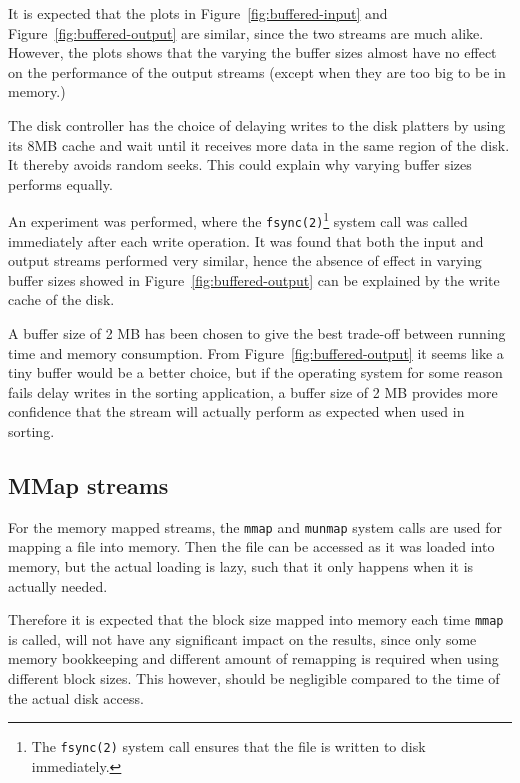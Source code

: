 \documentclass[a4paper,12pt]{article}
\begin{document}
It is expected that the plots in Figure~\ref{fig:buffered-input} and
Figure~\ref{fig:buffered-output} are similar, since the two streams
are much alike. However, the plots shows that the varying the buffer sizes
almost have no effect on the performance of the output streams (except
when they are too big to be in memory.)

The disk controller has the choice of delaying writes to the disk platters by using its 8MB cache and wait until it receives more data in the same region of the disk. It thereby avoids random seeks. This could explain why varying buffer sizes performs equally.

An experiment was performed, where the
\texttt{fsync(2)}\footnote{The \texttt{fsync(2)} system call ensures
  that the file is written to disk immediately.} system call was
called immediately after each write operation. It was found that both
the input and output streams performed very similar, hence the absence 
of effect in varying buffer sizes showed in
Figure~\ref{fig:buffered-output} can be explained by the write cache of the disk.

A buffer size of 2 MB has been chosen to give the best trade-off
between running time and memory consumption. From
Figure~\ref{fig:buffered-output} it seems like a tiny buffer would be
a better choice, but if the operating system for some reason fails
delay writes in the sorting application, a buffer size of 2 MB
provides more confidence that the stream will actually perform as
expected when used in sorting.

\subsection{MMap streams}
For the memory mapped streams, the \texttt{mmap} and \texttt{munmap}
system calls are used for mapping a file into memory. Then the file
can be accessed as it was loaded into memory, but the actual loading
is lazy, such that it only happens when it is actually needed.

Therefore it is expected that the block size mapped into memory each
time \texttt{mmap} is called, will not have any significant impact on
the results, since only some memory bookkeeping and different amount
of remapping is required when using different block sizes. This
however, should be negligible compared to the time of the actual disk
access.
\end{document}
